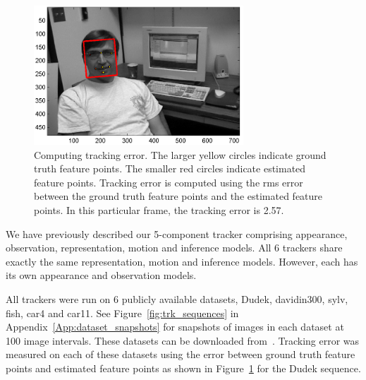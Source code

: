 								\begin{figure}[t]
								\centering
								\includegraphics[width=0.7\textwidth]{thesis/results_pca__trk_dudek_0007.png}
								\caption{Computing tracking error.  The larger yellow circles indicate ground truth feature points.  The smaller red circles indicate estimated feature points.  Tracking error is computed using the rms error between the ground truth feature points and the estimated feature points.  In this particular frame, the tracking error is 2.57.}
								\label{fig:results_pca__trk_dudek_0007}
								\end{figure}

We have previously described our 5-component tracker comprising appearance, observation, representation, motion and inference models.  All 6 trackers share exactly the same representation, motion and inference models.  However, each has its own appearance and observation models.

All trackers were run on 6 publicly available datasets, Dudek, davidin300, sylv, fish, car4 and car11.  See Figure~\ref{fig:trk_sequences} in Appendix~\ref{App:dataset_snapshots} for snapshots of images in each dataset at 100 image intervals.  These datasets can be downloaded from~\cite{2008_JNL_subspaceTRK_Ross}.  Tracking error was measured on each of these datasets using the error between ground truth feature points and estimated feature points as shown in Figure~\ref{fig:results_pca__trk_dudek_0007} for the Dudek sequence.

